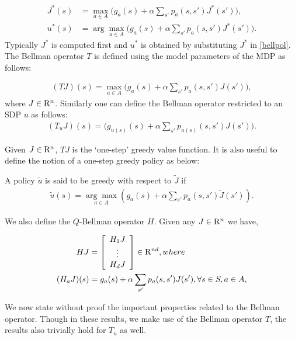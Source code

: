 \begin{subequations}\label{bell}
\begin{align}
\label{bellval}J^*(s)&=\max_{ a\in A}\big(g_a(s)+\alpha \sum_{s'}p_a(s,s')J^*(s')\big),\\
\label{bellpol}u^*(s)&=\arg\max_{ a\in A}\big(g_a(s)+\alpha \sum_{s'}p_a(s,s')J^*(s')\big).
\end{align}
\end{subequations}
Typically $J^*$ is computed first and $u^*$ is obtained by substituting $J^*$ in \eqref{bellpol}. The Bellman operator $T$ is defined using the model parameters of the MDP as follows:
\begin{definition}
\begin{align}
(TJ)(s)=\max_{a \in A}\big(g_a(s)+\alpha \sum_{s'} p_a(s,s')J(s')\big), 
\end{align}
where $J\in \mathrm{R}^n$. Similarly one can define the Bellman operator restricted to an SDP $u$ as follows:
\begin{align}
(T_uJ)(s)=\big(g_{u(s)}(s)+\alpha \sum_{s'} p_{u(s)}(s,s')J(s')\big).
\end{align}
\end{definition}
Given $J \in \mathrm{R}^n$, $TJ$ is the `one-step' greedy value function. It is also useful to define the notion of a one-step greedy policy as below:
\begin{definition}
A policy $\tilde{u}$ is said to be greedy with respect to $\tilde{J}$ if
\begin{align}\label{subpol}
\tilde{u}(s)=\underset{a \in A}{\arg\max}(g_a(s)+\alpha\sum_{s'} p_a(s,s')\tilde{J}(s')).
\end{align}
\end{definition}
\begin{definition}
We also define the $Q$-Bellman operator \cite{BertB} $H$. Given any $J\in \mathrm{R}^n$ we have,

\begin{align}
HJ&=\left[ {\begin{array}{c} H_1 J  \\ \vdots \\ H_d J\end{array}} \right]\in \mathrm{R}^{nd},\relax{where}\nonumber\\
(H_a J)(s)&= g_a(s)+\alpha \sum_{s'}p_a(s,s') J(s'), \forall s\in S, a\in A,
\end{align}
\end{definition}
 We now state without proof the important properties related to the Bellman operator. Though in these results, we make use of the Bellman operator $T$, the results also trivially hold for $T_u$ as well.
